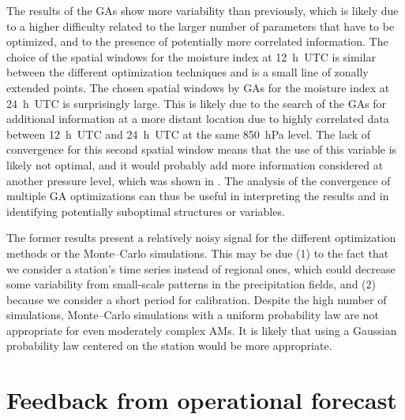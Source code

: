 \documentclass[gmd]{copernicus}
\begin{document}
The results of the GAs show more variability than previously, which is likely due to a higher difficulty related to the larger number of parameters that have to be optimized, and to the presence of potentially more correlated information. The choice of the spatial windows for the moisture index at 12~h~UTC is similar between the different optimization techniques and is a small line of zonally extended points. The chosen spatial windows by GAs for the moisture index at 24~h~UTC is surprisingly large. This is likely due to the search of the GAs for additional information at a more distant location due to highly correlated data between 12~h~UTC and 24~h~UTC at the same 850~hPa level. The lack of convergence for this second spatial window means that the use of this variable is likely not optimal, and it would probably add more information considered at another pressure level, which was shown in \citet{Horton2018a}. The analysis of the convergence of multiple GA optimizations can thus be useful in interpreting the results and in identifying potentially suboptimal structures or variables.

The former results present a relatively noisy signal for the different optimization methods or the Monte--Carlo simulations. This may be due (1) to the fact that we consider a station’s time series instead of regional ones, which could decrease some variability from small-scale patterns in the precipitation fields, and (2) because we consider a short period for calibration. Despite the high number of simulations, Monte--Carlo simulations with a uniform probability law are not appropriate for even moderately complex AMs. It is likely that using a Gaussian probability law centered on the station would be more appropriate.


\section{Feedback from operational forecast}
\label{sec:operational}
\end{document}
